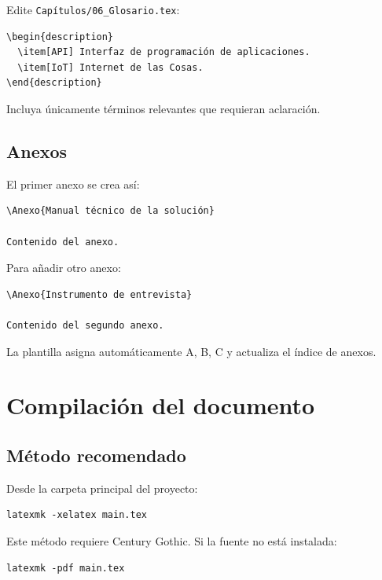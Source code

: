 \documentclass[12pt,a4paper,oneside]{report}
\begin{document}
Edite \texttt{Capítulos/06\_Glosario.tex}:

\begin{lstlisting}
\begin{description}
  \item[API] Interfaz de programación de aplicaciones.
  \item[IoT] Internet de las Cosas.
\end{description}
\end{lstlisting}

Incluya únicamente términos relevantes que requieran aclaración.

\section{Anexos}

El primer anexo se crea así:

\begin{lstlisting}
\Anexo{Manual técnico de la solución}

Contenido del anexo.
\end{lstlisting}

Para añadir otro anexo:

\begin{lstlisting}
\Anexo{Instrumento de entrevista}

Contenido del segundo anexo.
\end{lstlisting}

La plantilla asigna automáticamente A, B, C y actualiza el índice de anexos.

\chapter{Compilación del documento}

\section{Método recomendado}

Desde la carpeta principal del proyecto:

\begin{lstlisting}
latexmk -xelatex main.tex
\end{lstlisting}

Este método requiere Century Gothic. Si la fuente no está instalada:

\begin{lstlisting}
latexmk -pdf main.tex
\end{lstlisting}
\end{document}
